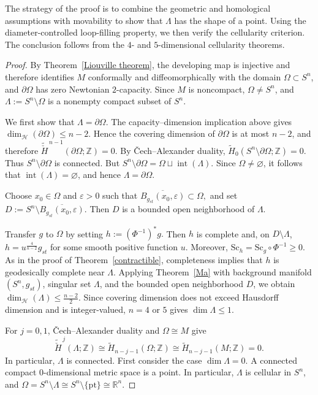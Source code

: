 \documentclass[12pt,oneside,a4paper]{article}
\theoremstyle{mytheorem}
\theoremstyle{remark}
\theoremstyle{definition}
\begin{document}
The strategy of the proof is to combine the geometric and homological assumptions with movability to show that $\Lambda$ has the shape of a point. Using the diameter-controlled loop-filling property, we then verify the cellularity criterion. The conclusion follows from the $4$- and $5$-dimensional cellularity theorems.

\begin{proof}
By Theorem~\ref{Liouville theorem}, the developing map is injective and
therefore identifies \(M\) conformally and diffeomorphically with the domain
\(\Omega\subset S^n\), and \(\partial\Omega\) has zero Newtonian
\(2\)-capacity. Since \(M\) is noncompact, \(\Omega\neq S^n\), and
\(\Lambda:=S^n\setminus\Omega\) is a nonempty compact subset of \(S^n\).

We first show that \(\Lambda=\partial\Omega\). The capacity--dimension
implication above gives
\(\dim_{\mathcal H}(\partial\Omega)\leq n-2\). Hence the covering dimension
of \(\partial\Omega\) is at most \(n-2\), and therefore
\(\widetilde{\check H}^{\,n-1}(\partial\Omega;\mathbb Z)=0.\) By
\v{C}ech--Alexander duality,
\(\widetilde H_0(S^n\setminus\partial\Omega;\mathbb Z)=0.\) Thus
\(S^n\setminus\partial\Omega\) is connected. But
\(S^n\setminus\partial\Omega =\Omega\sqcup\operatorname{int}(\Lambda).\)
Since \(\Omega\neq\varnothing\), it follows that
\(\operatorname{int}(\Lambda)=\varnothing\), and hence
\(\Lambda=\partial\Omega\).

Choose \(x_0\in\Omega\) and \(\varepsilon>0\) such that
\(\overline{B_{g_{st}}(x_0,\varepsilon)}\subset\Omega,\) and set
\(D:=S^n\setminus\overline{B_{g_{st}}(x_0,\varepsilon)}.\)
Then \(D\) is a bounded open neighborhood of \(\Lambda\).

Transfer \(g\) to \(\Omega\) by setting \(h:=(\Phi^{-1})^*g.\) Then \(h\) is
complete and, on \(D\setminus\Lambda\),
\(h=u^{\frac{4}{n-2}}g_{st}\) for some smooth positive function \(u\). Moreover,
\(\mathrm{Sc}_h=\mathrm{Sc}_g\circ\Phi^{-1}\geq0.\)
As in the proof of Theorem~\ref{contractible}, completeness implies that \(h\)
is geodesically complete near \(\Lambda\). Applying Theorem~\ref{Ma} with
background manifold \((S^n,g_{st})\), singular set \(\Lambda\), and the
bounded open neighborhood \(D\), we obtain
\(\dim_{\mathcal H}(\Lambda)\leq\frac{n-2}{2}\).
Since covering dimension does not exceed Hausdorff dimension and is
integer-valued, \(n=4\) or \(5\) gives
\(\dim\Lambda\leq1\).

For \(j=0,1\), \v{C}ech--Alexander duality and \(\Omega\cong M\) give
\[
\widetilde{\check H}^{\,j}(\Lambda;\mathbb Z)
\cong
\widetilde H_{n-j-1}(\Omega;\mathbb Z)
\cong
\widetilde H_{n-j-1}(M;\mathbb Z)
=0.
\]
In particular, \(\Lambda\) is connected. First consider the case
\(\dim\Lambda=0\). A connected compact
\(0\)-dimensional metric space is a point. In particular, \(\Lambda\) is
cellular in \(S^n\), and
\(\Omega=S^n\setminus\Lambda \cong S^n\setminus\{\mathrm{pt}\}
\cong \mathbb R^n.\)


\end{proof}
\end{document}
